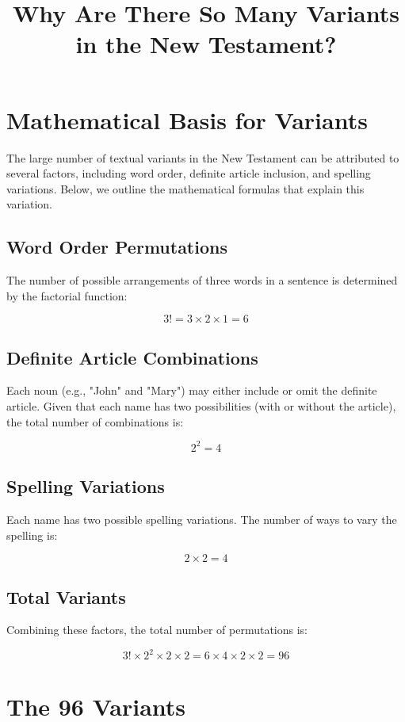 \documentclass{article}
\begin{document}
\title{Why Are There So Many Variants in the New Testament?}
\author{}
\date{}
\maketitle

\section*{Mathematical Basis for Variants}

The large number of textual variants in the New Testament can be attributed to several factors, including word order, definite article inclusion, and spelling variations. Below, we outline the mathematical formulas that explain this variation.

\subsection*{Word Order Permutations}
The number of possible arrangements of three words in a sentence is determined by the factorial function:

\[
3! = 3 \times 2 \times 1 = 6
\]

\subsection*{Definite Article Combinations}
Each noun (e.g., "John" and "Mary") may either include or omit the definite article. Given that each name has two possibilities (with or without the article), the total number of combinations is:

\[
2^2 = 4
\]

\subsection*{Spelling Variations}
Each name has two possible spelling variations. The number of ways to vary the spelling is:

\[
2 \times 2 = 4
\]

\subsection*{Total Variants}
Combining these factors, the total number of permutations is:

\[
3! \times 2^2 \times 2 \times 2 = 6 \times 4 \times 2 \times 2 = 96
\]

\section*{The 96 Variants}
\end{document}
